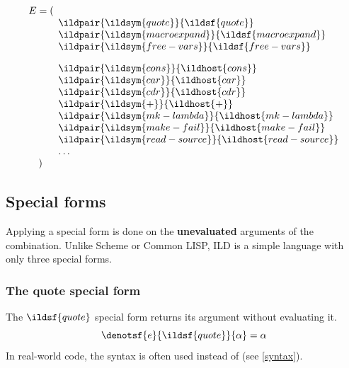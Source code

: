 \begin{equation}
  \begin{array}{@{}l@{}}
    E = ( \\
    \hspace{3em} \ildpair{\ildsym{quote}}{\ildsf{quote}} \\
    \hspace{3em} \ildpair{\ildsym{macroexpand}}{\ildsf{macroexpand}} \\
    \hspace{3em} \ildpair{\ildsym{free-vars}}{\ildsf{free-vars}} \\[1em]
    \hspace{3em} \ildpair{\ildsym{cons}}{\ildhost{cons}} \\
    \hspace{3em} \ildpair{\ildsym{car}}{\ildhost{car}} \\
    \hspace{3em} \ildpair{\ildsym{cdr}}{\ildhost{cdr}} \\
    \hspace{3em} \ildpair{\ildsym{+}}{\ildhost{+}} \\
    \hspace{3em} \ildpair{\ildsym{mk-lambda}}{\ildhost{mk-lambda}} \\
    \hspace{3em} \ildpair{\ildsym{make-fail}}{\ildhost{make-fail}} \\
    \hspace{3em} \ildpair{\ildsym{read-source}}{\ildhost{read-source}} \\
    \hspace{3em} \dots \\
    \hspace{1em})
  \end{array}
\end{equation}
\subsection{Special forms}
Applying a special form is done on the \textbf{unevaluated} arguments of the combination.
Unlike Scheme or Common LISP, ILD is a simple language with only three special forms.
\subsubsection{The quote special form}
The \(\ildsf{quote}\) special form returns its argument without evaluating it.
\begin{equation}
    \denotsf{e}{\ildsf{quote}}{\alpha} = \alpha
\end{equation}
In real-world code, the  syntax is often used instead of
 (see \cref{syntax}).
